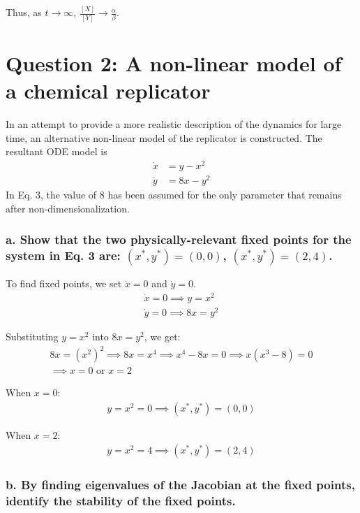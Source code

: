 \documentclass[12pt]{article}
\begin{document}
Thus, as $t \to \infty$, $\frac{[X]}{[Y]} \to \frac{\alpha}{\beta}$.

\section*{Question 2: A non-linear model of a chemical replicator}
In an attempt to provide a more realistic description of the dynamics for large time, an alternative non-linear
model of the replicator is constructed. The resultant ODE model is
\begin{equation}
    \begin{aligned}
        \dot{x} & = y - x^2  \\
        \dot{y} & = 8x - y^2
    \end{aligned}
    \tag{3}
\end{equation}
In Eq. 3, the value of 8 has been assumed for the only parameter that remains after non-dimensionalization.

\subsubsection*{a. Show that the two physically-relevant fixed points for the system in Eq. 3 are:
    $(x^*,y^*) = (0,0)$,
    $(x^*,y^*) = (2,4)$.}

To find fixed points, we set $\dot{x} = 0$ and $\dot{y} = 0$.
\begin{align*}
    \dot{x} = 0 \implies y = x^2 \\
    \dot{y} = 0 \implies 8x = y^2
\end{align*}

Substituting $y = x^2$ into $8x = y^2$, we get:
\begin{align*}
    8x = {(x^2)}^2 \implies 8x = x^4 \implies x^4 - 8x = 0 \implies x(x^3 - 8) = 0 \\
    \implies x = 0 \text{ or } x = 2
\end{align*}

When $x = 0$:
\begin{align*}
    y = x^2 = 0 \implies (x^*,y^*) = (0,0)
\end{align*}

When $x = 2$:
\begin{align*}
    y = x^2 = 4 \implies (x^*,y^*) = (2,4)
\end{align*}

\subsubsection*{b. By finding eigenvalues of the Jacobian at the fixed points, identify the stability of the fixed points.}
\end{document}
